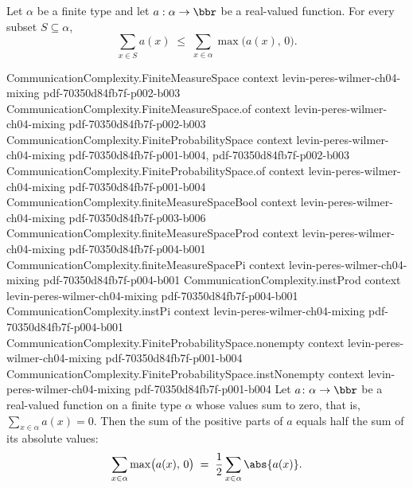 \begin{lemma}
\label{CommunicationComplexity.TVDistance.sum_indicator_le_sum_posPart}
\leanok
{}
Let $\alpha$ be a finite type and let $a : \alpha \to \bbr$ be a real-valued function.
For every subset $S \subseteq \alpha$,
\[
\sum_{x \in S} a(x) \;\le\; \sum_{x \in \alpha} \max\bigl(a(x),\,0\bigr).
\]
\end{lemma}

\begin{lemma}
\proofstep
  {CommunicationComplexity.FiniteMeasureSpace}
  {context}
  {levin-peres-wilmer-ch04-mixing}
  {pdf-70350d84fb7f-p002-b003}
\proofstep
  {CommunicationComplexity.FiniteMeasureSpace.of}
  {context}
  {levin-peres-wilmer-ch04-mixing}
  {pdf-70350d84fb7f-p002-b003}
\proofstep
  {CommunicationComplexity.FiniteProbabilitySpace}
  {context}
  {levin-peres-wilmer-ch04-mixing}
  {pdf-70350d84fb7f-p001-b004,
    pdf-70350d84fb7f-p002-b003}
\proofstep
  {CommunicationComplexity.FiniteProbabilitySpace.of}
  {context}
  {levin-peres-wilmer-ch04-mixing}
  {pdf-70350d84fb7f-p001-b004}
\proofstep
  {CommunicationComplexity.finiteMeasureSpaceBool}
  {context}
  {levin-peres-wilmer-ch04-mixing}
  {pdf-70350d84fb7f-p003-b006}
\proofstep
  {CommunicationComplexity.finiteMeasureSpaceProd}
  {context}
  {levin-peres-wilmer-ch04-mixing}
  {pdf-70350d84fb7f-p004-b001}
\proofstep
  {CommunicationComplexity.finiteMeasureSpacePi}
  {context}
  {levin-peres-wilmer-ch04-mixing}
  {pdf-70350d84fb7f-p004-b001}
\proofstep
  {CommunicationComplexity.instProd}
  {context}
  {levin-peres-wilmer-ch04-mixing}
  {pdf-70350d84fb7f-p004-b001}
\proofstep
  {CommunicationComplexity.instPi}
  {context}
  {levin-peres-wilmer-ch04-mixing}
  {pdf-70350d84fb7f-p004-b001}
\proofstep
  {CommunicationComplexity.FiniteProbabilitySpace.nonempty}
  {context}
  {levin-peres-wilmer-ch04-mixing}
  {pdf-70350d84fb7f-p001-b004}
\proofstep
  {CommunicationComplexity.FiniteProbabilitySpace.instNonempty}
  {context}
  {levin-peres-wilmer-ch04-mixing}
  {pdf-70350d84fb7f-p001-b004}
\label{CommunicationComplexity.TVDistance.sum_posPart_eq_half_sum_abs}
\leanok
{}
Let $a\colon\alpha\to\bbr$ be a real-valued function on a finite type $\alpha$ whose
values sum to zero, that is, $\sum_{x\in\alpha} a(x) = 0$. Then the sum of the positive
parts of $a$ equals half the sum of its absolute values:
\[
\sum_{x\in\alpha} \max\bigl(a(x),\,0\bigr) \;=\; \frac{1}{2}\sum_{x\in\alpha}
\abs{a(x)}.
\]
\end{lemma}

